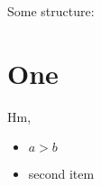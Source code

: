 \documentclass{article}
\begin{document}
Some structure:
\section{One}
Hm,
\begin{itemize}
\item $a>b$
\item second item
\end{itemize}
\end{document}
